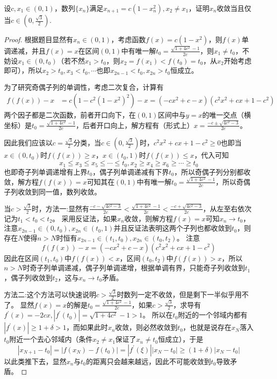 \documentclass[../../main.tex]{subfiles}
\begin{document}
\begin{example}
设\(c,x_1\in(0,1)\)，数列\(\{x_n\}\)满足\(x_{n + 1}=c(1 - x_n^2),x_2\neq x_1\)，证明\(x_n\)收敛当且仅当\(c\in\left(0,\frac{\sqrt{3}}{2}\right)\).
\end{example}
\begin{proof}
根据题目显然有\(x_n\in(0,1)\)，考虑函数\(f(x)=c(1 - x^2)\)，则\(f(x)\)单调递减，并且\(f(x)=x\)在区间\((0,1)\)中有唯一解\(t_0 = \frac{\sqrt{1 + 4c^2}-1}{2c}\)，则\(x_1\neq t_0\)，不妨设\(x_1\in(0,t_0)\)（若不然\(x_1 > t_0\)，则\(x_2 = f(x_1)<f(t_0)=t_0\)，从\(x_2\)开始考虑即可），所以\(x_2>t_0,x_3<t_0,\cdots\)也即\(x_{2n - 1}<t_0,x_{2n}>t_0\)恒成立。

为了研究奇偶子列的单调性，考虑二次复合，计算有
\begin{align*}
f(f(x)) - x&=c\left(1 - c^2(1 - x^2)^2\right)-x=(-cx^2 + c - x)(c^2x^2 + cx + 1 - c^2)
\end{align*}
两个因子都是二次函数，前者开口向下，在\((0,1)\)区间中与\(y = x\)的唯一交点（横坐标）是\(t_0 = \frac{\sqrt{1 + 4c^2}-1}{2c}\)，后者开口向上，解方程有（形式上）\(x=\frac{-c\pm\sqrt{4c^2 - 3}}{2c}\)。

因此我们应该以\(c = \frac{\sqrt{3}}{2}\)分类，当\(c\in\left(0,\frac{\sqrt{3}}{2}\right)\)时，\(c^2x^2 + cx + 1 - c^2\geqslant 0\)也即当\(x\in(0,t_0)\)时\(f(f(x))\geqslant  x\)，\(x\in(t_0,1)\)时\(f(f(x))\leqslant  x\)，代入可知
\[x_1\leqslant  x_3\leqslant  x_5\leqslant \cdots\leqslant  t_0,x_2\geqslant  x_4\geqslant  x_6\geqslant \cdots\geqslant  t_0\]
也即奇子列单调递增有上界\(t_0\)，偶子列单调递减有下界\(t_0\)，所以奇偶子列分别都收敛，解方程\(f(f(x)) = x\)可知其在\((0,1)\)中有唯一解\(t_0 = \frac{\sqrt{1 + 4c^2}-1}{2c}\)，所以奇偶子列收敛到同一值，数列收敛。

当\(c>\frac{\sqrt{3}}{2}\)时，{\color{blue}方法一:}显然有\(\frac{-c - \sqrt{4c^2 - 3}}{2c}<\frac{\sqrt{1 + 4c^2}-1}{2c}<\frac{-c + \sqrt{4c^2 - 3}}{2c}\)，从左至右依次记为\(t_1<t_0<t_2\)。
采用反证法，如果\(x_n\)收敛，则解方程\(f(x)=x\)可知\(x_n\rightarrow t_0\)，注意\(x_{2n - 1}\in(0,t_0),x_{2n}\in(t_0,1)\)并且反证法表明这两个子列也都收敛到\(t_0\)，则存在\(N\)使得\(n > N\)时恒有\(x_{2n - 1}\in(t_1,t_0),x_{2n}\in(t_0,t_2)\)。
注意
\[f(f(x)) - x=(-cx^2 + c - x)(c^2x^2 + cx + 1 - c^2)\]
因此在区间\((t_1,t_0)\)中\(f(f(x))<x\)，区间\((t_0,t_2)\)中\(f(f(x))>x\)，所以\(n > N\)时奇子列单调递减，偶子列单调递增，根据单调有界，只能奇子列收敛到\(t_1\)，偶子列收敛到\(t_2\)，这与\(x_n\rightarrow t_0\)矛盾。

{\color{blue}方法二:}这个方法可以快速说明\(c>\frac{\sqrt{3}}{2}\)时数列一定不收敛，但是剩下一半似乎用不了。
显然\(f(x)=x\)的解是\(t_0 = \frac{\sqrt{1 + 4c^2}-1}{2c}\)，如果\(c>\frac{\sqrt{3}}{2}\)，求导有\(f^\prime(x)=-2cx,|f^\prime(t_0)|=\sqrt{1 + 4c^2}-1>1\)。
所以在\(t_0\)附近的一个邻域内都有\(|f^\prime(x)|\geqslant 1+\delta>1\)，而如果此时\(x_n\)收敛，则必然收敛到\(t_0\)，也就是说存在\(x_N\)落入\(t_0\)附近一个去心邻域内（条件\(x_2\neq x_1\)保证了\(x_n\neq t_0\)恒成立），于是
\[|x_{N + 1}-t_0|=|f(x_N)-f(t_0)|=|f^\prime(\xi)||x_N - t_0|\geqslant (1 + \delta)|x_N - t_0|\]
以此类推下去，显然\(x_n\)与\(t_0\)的距离只会越来越远，因此不可能收敛到\(t_0\)导致矛盾。
\end{proof}
\end{document}
